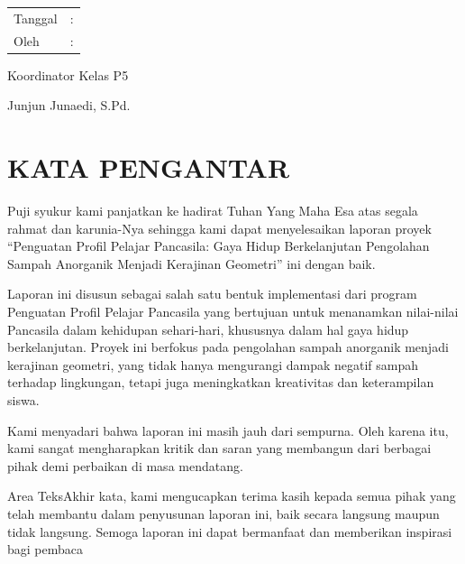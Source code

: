 \documentclass[a4paper,12pt, bahasa]{article}
\begin{document}
\begin{table}[ht]
    \begin{tabular}{ll}
        Tanggal &: \\
        Oleh&: \\
    \end{tabular}
\end{table}
\vspace{5cm}
Koordinator Kelas P5\\
\newline

\vspace{5cm}
Junjun Junaedi, S.Pd.\\
\pagebreak

    \section*{KATA PENGANTAR}

Puji syukur kami panjatkan ke hadirat Tuhan Yang Maha Esa atas segala rahmat dan karunia-Nya sehingga kami dapat menyelesaikan laporan proyek “Penguatan Profil Pelajar Pancasila: Gaya Hidup Berkelanjutan Pengolahan Sampah Anorganik Menjadi Kerajinan Geometri” ini dengan baik. 

Laporan ini disusun sebagai salah satu bentuk implementasi dari program Penguatan Profil Pelajar Pancasila yang bertujuan untuk menanamkan nilai-nilai Pancasila dalam kehidupan sehari-hari, khususnya dalam hal gaya hidup berkelanjutan. Proyek ini berfokus pada pengolahan sampah anorganik menjadi kerajinan geometri, yang tidak hanya mengurangi dampak negatif sampah terhadap lingkungan, tetapi juga meningkatkan kreativitas dan keterampilan siswa. 

Kami menyadari bahwa laporan ini masih jauh dari sempurna. Oleh karena itu, kami sangat mengharapkan kritik dan saran yang membangun dari berbagai pihak demi perbaikan di masa mendatang. 

Area TeksAkhir kata, kami mengucapkan terima kasih kepada semua pihak yang telah membantu dalam penyusunan laporan ini, baik secara langsung maupun tidak langsung. Semoga laporan ini dapat bermanfaat dan memberikan inspirasi bagi pembaca\\

    \vspace{3cm}
\pagebreak
\end{document}
